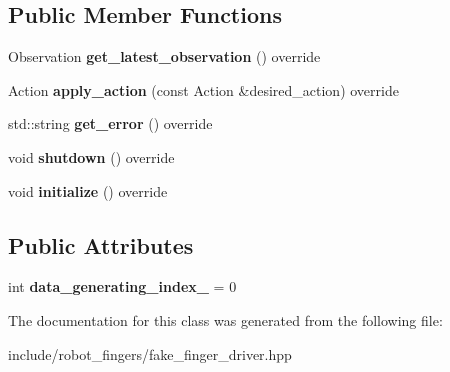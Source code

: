 \subsection*{Public Member Functions}
\begin{DoxyCompactItemize}
\item 
\mbox{\label{classrobot__fingers_1_1FakeFingerDriver_a20659a124d26cec0f1ce32c03a4d7103}} 
Observation {\bfseries get\+\_\+latest\+\_\+observation} () override
\item 
\mbox{\label{classrobot__fingers_1_1FakeFingerDriver_a27f8b6776825a9d037a9cafad542a40f}} 
Action {\bfseries apply\+\_\+action} (const Action \&desired\+\_\+action) override
\item 
\mbox{\label{classrobot__fingers_1_1FakeFingerDriver_a490d15910b7b70c1311f4afa6d16b30a}} 
std\+::string {\bfseries get\+\_\+error} () override
\item 
\mbox{\label{classrobot__fingers_1_1FakeFingerDriver_ad09f44f1223938439637bfc80974e033}} 
void {\bfseries shutdown} () override
\item 
\mbox{\label{classrobot__fingers_1_1FakeFingerDriver_a1013f49d736069d57fe5fe2e2575505c}} 
void {\bfseries initialize} () override
\end{DoxyCompactItemize}
\subsection*{Public Attributes}
\begin{DoxyCompactItemize}
\item 
\mbox{\label{classrobot__fingers_1_1FakeFingerDriver_ad29266b05949f57644976262f09fedc8}} 
int {\bfseries data\+\_\+generating\+\_\+index\+\_\+} = 0
\end{DoxyCompactItemize}


The documentation for this class was generated from the following file\+:\begin{DoxyCompactItemize}
\item 
include/robot\+\_\+fingers/fake\+\_\+finger\+\_\+driver.\+hpp\end{DoxyCompactItemize}
